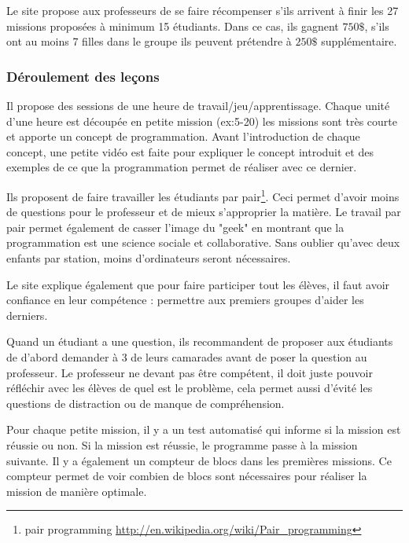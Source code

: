 Le site propose aux professeurs de se faire récompenser s'ils arrivent à finir les 27 missions proposées à minimum 15 étudiants. Dans ce cas, ils gagnent $750\$$, s'ils ont au moins 7 filles dans le groupe ils peuvent prétendre à $250\$$ supplémentaire.

\subsubsection{Déroulement des leçons}
Il propose des sessions de une heure de travail/jeu/apprentissage. Chaque unité d'une heure est découpée en petite mission (ex:5-20) les missions sont très courte et apporte un concept de programmation. Avant l'introduction de chaque concept, une petite vidéo est faite pour expliquer le concept introduit et des exemples de ce que la programmation permet de réaliser avec ce dernier.

Ils proposent de faire travailler les étudiants par pair\footnote{pair programming \url{http://en.wikipedia.org/wiki/Pair\_programming}}. Ceci permet d'avoir moins de questions pour le professeur et de mieux s'approprier la matière. Le travail par pair permet également de casser l'image du "geek" en montrant que la programmation est une science sociale et collaborative. Sans oublier qu'avec deux enfants par station, moins d'ordinateurs seront nécessaires.

Le site explique également que pour faire participer tout les élèves, il faut avoir confiance en leur compétence : permettre aux premiers groupes d'aider les derniers.

Quand un étudiant a une question, ils recommandent de proposer aux étudiants de d'abord demander à 3 de leurs camarades avant de poser la question au professeur. Le professeur ne devant pas être compétent, il doit juste pouvoir réfléchir avec les élèves de quel est le problème, cela permet aussi d'évité les questions de distraction ou de manque de compréhension.

Pour chaque petite mission, il y a un test automatisé qui informe si la mission est réussie ou non. Si la mission est réussie, le programme passe à la mission suivante. Il y a également un compteur de blocs dans les premières missions. Ce compteur permet de voir combien de blocs sont nécessaires pour réaliser la mission de manière optimale.

